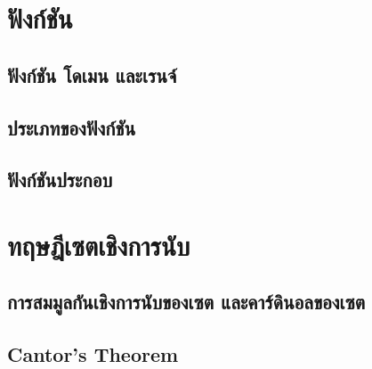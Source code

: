 \section{ฟังก์ชัน}
\subsection{ฟังก์ชัน โดเมน และเรนจ์}
\subsection{ประเภทของฟังก์ชัน}
\subsection{ฟังก์ชันประกอบ}

\section{ทฤษฎีเซตเชิงการนับ}
\subsection{การสมมูลกันเชิงการนับของเซต และคาร์ดินอลของเซต}
\subsection{Cantor's Theorem}